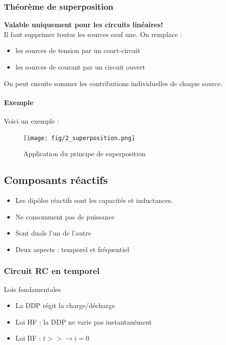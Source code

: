\documentclass[a4paper]{article}
\begin{document}
    \subsubsection{Théorème de superposition}
    \textbf{Valable uniquement pour les circuits linéaires!}\\

    Il faut supprimer toutes les sources sauf une. On remplace :
    \begin{itemize}
        \item les sources de tension par un court-circuit
        \item les sources de courant par un circuit ouvert
    \end{itemize}
    On peut ensuite sommer les contributions individuelles de chaque source.

    \paragraph{Exemple} Voici un exemple :
    \begin{figure}[H]
        \begin{center}
            \texttt{[image: fig/2\_superposition.png]}
            \caption{Application du principe de superposition}
            \label{fig:2_superposition}
        \end{center}
    \end{figure}

    \subsection{Composants réactifs}
        \begin{itemize}
            \item Les dipôles réactifs sont les capacités et inductances.
            \item Ne consomment pas de puissance
            \item Sont duals l'un de l'autre
            \item Deux aspects : temporel et fréquentiel
        \end{itemize}
        \subsubsection{Circuit RC en temporel}
            Lois fondamentales
            \begin{itemize}
                \item La DDP régit la charge/décharge
                \item Loi HF : la DDP ne varie pas instantanément
                \item Loi BF : $ t>> \rightarrow i = 0 $
            \end{itemize}
\end{document}
